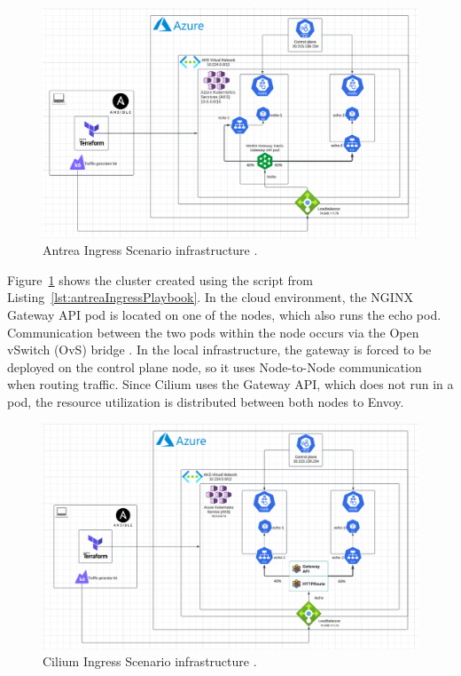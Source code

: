 \begin{figure}[tbh]
  \centering
  \includegraphics[width=1\columnwidth]{images/antrea_cloud_traffic_splitting.png}
  \caption{Antrea Ingress Scenario infrastructure \cite{TerraformIcon}\cite{AnsibleIcon}\cite{K6}\cite{NGINX}\cite{K8sIcons}\cite{AzureIcons}\cite{LucidApp}.}
  \label{fig:antreaIngressScenarioArch}
\end{figure}

Figure~\ref{fig:antreaIngressScenarioArch} shows the cluster created using the script from Listing~\ref{lst:antreaIngressPlaybook}. In the cloud environment, the NGINX Gateway API pod is located on one of the nodes, which also runs the echo pod. Communication between the two pods within the node occurs via the Open vSwitch (OvS) bridge \cite{AntreaArch}. In the local infrastructure, the gateway is forced to be deployed on the control plane node, so it uses Node-to-Node communication when routing traffic. Since Cilium uses the Gateway API, which does not run in a pod, the resource utilization is distributed between both nodes to Envoy.



\begin{figure}[H]
  \centering
  \includegraphics[width=1\columnwidth]{images/cilium_cloud_traffic_splitting.png}
  \caption{Cilium Ingress Scenario infrastructure \cite{CiliumComponents}\cite{CiliumGatewayAPIBlog}\cite{K6}\cite{K8sIcons}\cite{TerraformIcon}\cite{AnsibleIcon}\cite{KindIcon}\cite{DockerIcon}\cite{AzureIcons}\cite{LucidApp}.}
  \label{fig:ciliumIngressScenarioArch}
\end{figure}

